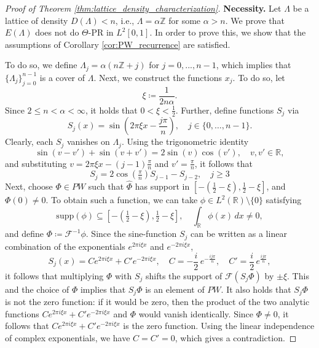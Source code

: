 \documentclass[10pt,a4paper]{amsart}
\def\R{{\mathbb R}}
\def\Z{{\mathbb Z}}
\newcommand{\ift}{{\mathcal{F}^{-1}}}
\newcommand{\supp}{{\mathrm{supp}}}
\begin{document}
\begin{proof}[Proof of Theorem \ref{thm:lattice_density_characterization}]
\textbf{Necessity.}
    Let $\Lambda$ be a lattice of density $D(\Lambda) < n$, i.e., $\Lambda = \alpha \Z$ for some $\alpha > n$. We prove that $E(\Lambda)$ does not do $\Theta$-PR in $L^2[0,1]$. In order to prove this, we show that the assumptions of Corollary \ref{cor:PW_recurrence} are satisfied.
    
    To do so, we define $\Lambda_j = \alpha(n\Z+j)$ for $j=0,...,n-1$, which implies that $\{ \Lambda_j \}_{j=0}^{n-1}$ is a cover of $\Lambda$. Next, we construct the functions $x_j$. To do so, let
    $$
    \xi \coloneqq \frac{1}{2n\alpha}.
    $$
    Since $2\leq n<\alpha < \infty$, it holds that $0 < \xi < \frac{1}{2}$. Further, define functions $S_j$ via
    $$
    S_j(x) = \sin \left ( 2\pi \xi x - \frac{j\pi}{n} \right ), \quad j \in \{ 0, \dots, n-1 \}.
    $$
    Clearly, each $S_j$ vanishes on $\Lambda_j$. Using the trigonometric identity
    $$
    \sin(v-v') + \sin(v+v') = 2 \sin(v)\cos(v'), \quad v,v' \in \R,
    $$
    and substituting $v = 2\pi \xi x  - (j-1)\frac{\pi}{n}$ and $v' = \frac{\pi}{n}$, it follows that
    $$
    S_j = 2 \cos(\tfrac{\pi}{n}) S_{j-1} - S_{j-2}, \quad j \geq 3
    $$
    Next, choose $\Phi \in PW$ such that $\hat \Phi$ has support in $[-(\frac{1}{2}-\xi),\frac{1}{2}-\xi]$, and $\Phi(0) \neq 0$. To obtain such a function, we can take $\phi \in L^2(\R) \setminus \{0 \}$ satisfying
    $$
    \supp(\phi) \subseteq [-(\tfrac{1}{2}-\xi),\tfrac{1}{2}-\xi], \quad \int_\R \phi(x) \, dx \neq 0,
    $$
    and define $\Phi \coloneqq \ift \phi$.
    Since the sine-function $S_j$ can be written as a linear combination of the exponentials $e^{2\pi i \xi x}$ and $e^{-2\pi i \xi x}$,
    $$
    S_j(x) = C e^{2\pi i \xi x} + C'e^{-2\pi i \xi x}, \quad C=-\frac{i}{2}\, e^{ -\frac{i j \pi}{n}}, \quad C' = \frac{i}{2}\, e^{\frac{i j \pi}{n}},
    $$
    it follows that multiplying $\Phi$ with $S_j$ shifts the support of $\mathcal{F}(S_j \Phi)$ by $\pm \xi$. This and the choice of $\Phi$ implies that $S_j \Phi$ is an element of $PW$. It also holds that $S_j \Phi$ is not the zero function: if it would be zero, then the product of the two analytic functions $C e^{2\pi i \xi x} + C'e^{-2\pi i \xi x}$ and $\Phi$ would vanish identically. Since $\Phi \neq 0$, it follows that $C e^{2\pi i \xi x} + C'e^{-2\pi i \xi x}$ is the zero function. Using the linear independence of complex exponentials, we have $C=C'=0$, which gives a contradiction.
    

\end{proof}
\end{document}
